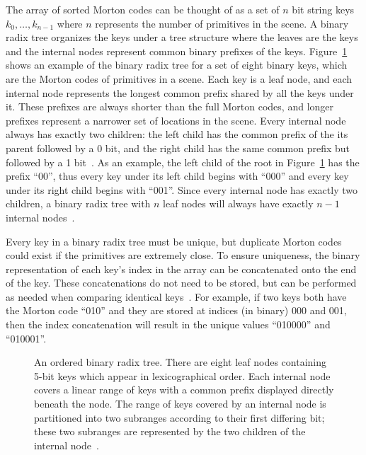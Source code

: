\documentclass{sig-alternate}
\begin{document}
The array of sorted Morton codes can be thought of as a set of $n$ bit string keys \begin{math}k_{0},\dots,k_{n-1}\end{math} where $n$ represents the number of primitives in the scene. A binary radix tree organizes the keys under a tree structure where the leaves are the keys and the internal nodes represent common binary prefixes of the keys. Figure~\ref{fig:BinaryRadixTree} shows an example of the binary radix tree for a set of eight binary keys, which are the Morton codes of primitives in a scene. Each key is a leaf node, and each internal node represents the longest common prefix shared by all the keys under it. These prefixes are always shorter than the full Morton codes, and longer prefixes represent a narrower set of locations in the scene. Every internal node always has exactly two children: the left child has the common prefix of the its parent followed by a 0 bit, and the right child has the same common prefix but followed by a 1 bit~\cite{Karras:2012}. As an example, the left child of the root in Figure~\ref{fig:BinaryRadixTree} has the prefix ``00'', thus every key under its left child begins with ``000'' and every key under its right child begins with ``001''. Since every internal node has exactly two children, a binary radix tree with $n$ leaf nodes will always have exactly $n-1$ internal nodes~\cite{Wald:2007}.

Every key in a binary radix tree must be unique, but duplicate Morton codes could exist if the primitives are extremely close. To ensure uniqueness, the binary representation of each key's index in the array can be concatenated onto the end of the key. These concatenations do not need to be stored, but can be performed as needed when comparing identical keys~\cite{Karras:2012}. For example, if two keys both have the Morton code ``010'' and they are stored at indices (in binary) 000 and 001, then the index concatenation will result in the unique values ``010000'' and ``010001''. 

\begin{figure}
\centering
{}
\caption{An ordered binary radix tree. There are eight leaf nodes containing 5-bit keys which appear in lexicographical order. Each internal node covers a linear range of keys with a common prefix displayed directly beneath the node. The range of keys covered by an internal node is partitioned into two subranges according to their first differing bit; these two subranges are represented by the two children of the internal node~\cite{Karras:2012}.}
\label{fig:BinaryRadixTree}
\end{figure}
\end{document}
